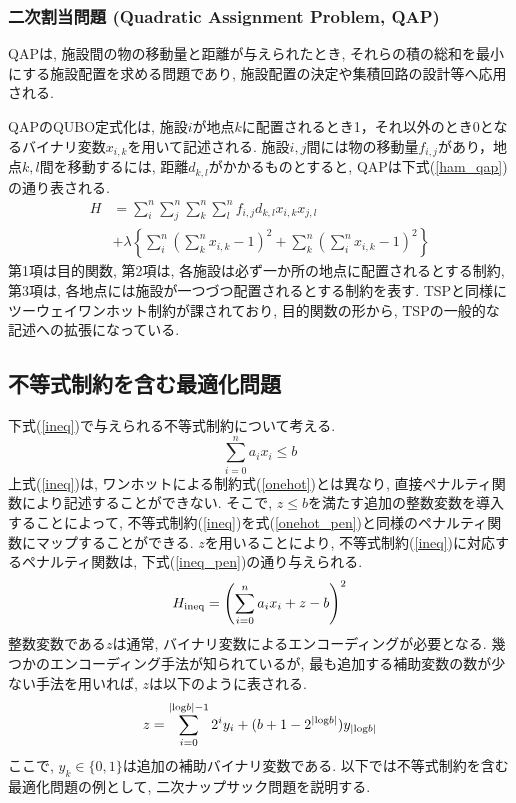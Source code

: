 \documentclass[submit,techrep,noauthor]{ipsj}
\begin{document}
\subsubsection{二次割当問題 (Quadratic Assignment Problem, QAP)}
QAPは, 施設間の物の移動量と距離が与えられたとき, それらの積の総和を最小にする施設配置を求める問題であり, 施設配置の決定や集積回路の設計等へ応用される.

QAPのQUBO定式化は, 施設$i$が地点$k$に配置されるとき1，それ以外のとき0となるバイナリ変数$x_{i,k}$を用いて記述される. 施設$i, j$間には物の移動量$f_{i,j}$があり，地点$k, l$間を移動するには, 距離$d_{k, l}$がかかるものとすると,
 QAPは下式(\ref{ham_qap})の通り表される.
\begin{align}
H &= \sum_{i}^{n}\sum_{j}^{n}\sum_{k}^{n}\sum_{l}^{n}f_{i,j}d_{k,l}x_{i,k}x_{j,l}\nonumber\\
&+\lambda\left\{\sum_{i}^{n}\left(\sum_{k}^{n}x_{i,k}-1\right)^{2} + \sum_{k}^{n}\left(\sum_{i}^{n}x_{i,k}-1\right)^{2}\right\} \label{ham_qap}
\end{align}
第1項は目的関数, 第2項は, 各施設は必ず一か所の地点に配置されるとする制約, 第3項は, 各地点には施設が一つづつ配置されるとする制約を表す. TSPと同様にツーウェイワンホット制約が課されており, 目的関数の形から, TSPの一般的な記述への拡張になっている.

\subsection{不等式制約を含む最適化問題}
下式(\ref{ineq})で与えられる不等式制約について考える.
\begin{equation}
\sum_{i=0}^{n}a_{i}x_{i}\le b \label{ineq}
\end{equation}
上式(\ref{ineq})は, ワンホットによる制約式(\ref{onehot})とは異なり, 直接ペナルティ関数により記述することができない. そこで, $z\le b$を満たす追加の整数変数を導入することによって, 不等式制約(\ref{ineq})を式(\ref{onehot_pen})と同様のペナルティ関数にマップすることができる. $z$を用いることにより, 不等式制約(\ref{ineq})に対応するペナルティ関数は, 下式(\ref{ineq_pen})の通り与えられる.
\begin{equation}
H_{\rm{ineq}} = \left(\sum_{i=0}^{n}a_{i}x_{i}+z-b\right)^{2} \label{ineq_pen}
\end{equation}
整数変数である$z$は通常, バイナリ変数によるエンコーディングが必要となる. 幾つかのエンコーディング手法が知られているが, 最も追加する補助変数の数が少ない手法を用いれば, $z$は以下のように表される.
\begin{equation}
z = \sum_{i=0}^{|{\rm{log}}b|-1}2^{i}y_{i}+(b+1-2^{|{\rm{log}}b|})y_{|{\rm{log}}b|}
\end{equation}
ここで, $y_{k}\in \{0, 1\}$は追加の補助バイナリ変数である. 以下では不等式制約を含む最適化問題の例として, 二次ナップサック問題を説明する.
\end{document}
